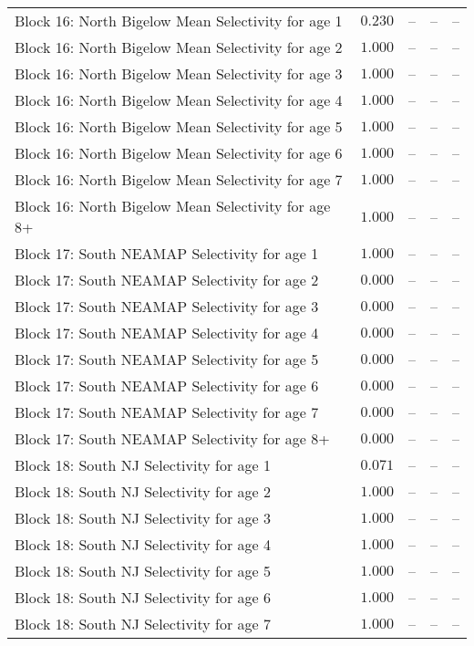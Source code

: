 \documentclass[
]{article}
\begin{document}
\begin{landscape}
\begin{longtable}[t]{lrrrr}
Block 16: North Bigelow Mean Selectivity for age 1 & $0.230$ & -- & -- & --\\
Block 16: North Bigelow Mean Selectivity for age 2 & $1.000$ & -- & -- & --\\
Block 16: North Bigelow Mean Selectivity for age 3 & $1.000$ & -- & -- & --\\
\addlinespace
Block 16: North Bigelow Mean Selectivity for age 4 & $1.000$ & -- & -- & --\\
Block 16: North Bigelow Mean Selectivity for age 5 & $1.000$ & -- & -- & --\\
Block 16: North Bigelow Mean Selectivity for age 6 & $1.000$ & -- & -- & --\\
Block 16: North Bigelow Mean Selectivity for age 7 & $1.000$ & -- & -- & --\\
Block 16: North Bigelow Mean Selectivity for age 8+ & $1.000$ & -- & -- & --\\
\addlinespace
Block 17: South NEAMAP Selectivity for age 1 & $1.000$ & -- & -- & --\\
Block 17: South NEAMAP Selectivity for age 2 & $0.000$ & -- & -- & --\\
Block 17: South NEAMAP Selectivity for age 3 & $0.000$ & -- & -- & --\\
Block 17: South NEAMAP Selectivity for age 4 & $0.000$ & -- & -- & --\\
Block 17: South NEAMAP Selectivity for age 5 & $0.000$ & -- & -- & --\\
\addlinespace
Block 17: South NEAMAP Selectivity for age 6 & $0.000$ & -- & -- & --\\
Block 17: South NEAMAP Selectivity for age 7 & $0.000$ & -- & -- & --\\
Block 17: South NEAMAP Selectivity for age 8+ & $0.000$ & -- & -- & --\\
Block 18: South NJ Selectivity for age 1 & $0.071$ & -- & -- & --\\
Block 18: South NJ Selectivity for age 2 & $1.000$ & -- & -- & --\\
\addlinespace
Block 18: South NJ Selectivity for age 3 & $1.000$ & -- & -- & --\\
Block 18: South NJ Selectivity for age 4 & $1.000$ & -- & -- & --\\
Block 18: South NJ Selectivity for age 5 & $1.000$ & -- & -- & --\\
Block 18: South NJ Selectivity for age 6 & $1.000$ & -- & -- & --\\
Block 18: South NJ Selectivity for age 7 & $1.000$ & -- & -- & --\\

\end{longtable}
\end{landscape}
\end{document}

